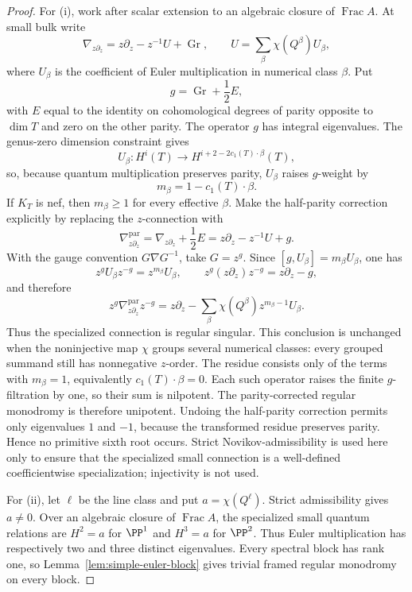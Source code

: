\begin{proof}
For (i), work after scalar extension to an algebraic closure of
\(\operatorname{Frac}A\).  At small bulk write
\[
 \nabla_{z\partial_z}=z\partial_z-z^{-1}U+\operatorname{Gr},
 \qquad
 U=\sum_{\beta}\chi(Q^\beta)U_\beta,
\]
where \(U_\beta\) is the coefficient of Euler multiplication in numerical
class \(\beta\).  Put
\[
 g=\operatorname{Gr}+\frac12E,
\]
with \(E\) equal to the identity on cohomological degrees of parity
opposite to \(\dim T\) and zero on the other parity.  The operator \(g\) has
integral eigenvalues.  The genus-zero dimension constraint gives
\[
 U_\beta:H^i(T)\longrightarrow
 H^{i+2-2c_1(T)\cdot\beta}(T),
\]
so, because quantum multiplication preserves parity, \(U_\beta\) raises
\(g\)-weight by
\[
 m_\beta=1-c_1(T)\cdot\beta.
\]
If \(K_T\) is nef, then \(m_\beta\ge1\) for every effective
\(\beta\).  Make the half-parity correction explicitly by replacing the
\(z\)-connection with
\[
 \nabla^{\mathrm{par}}_{z\partial_z}
 =\nabla_{z\partial_z}+\frac12E
 =z\partial_z-z^{-1}U+g.
\]
With the gauge convention \(G\nabla G^{-1}\), take \(G=z^g\).  Since
\([g,U_\beta]=m_\beta U_\beta\), one has
\[
 z^gU_\beta z^{-g}=z^{m_\beta}U_\beta,
 \qquad
 z^g(z\partial_z)z^{-g}=z\partial_z-g,
\]
and therefore
\[
 z^g\nabla^{\mathrm{par}}_{z\partial_z}z^{-g}
 =z\partial_z-
   \sum_\beta \chi(Q^\beta)z^{m_\beta-1}U_\beta.
\]
Thus the specialized connection is regular singular.  This conclusion is
unchanged when the noninjective map \(\chi\) groups several numerical
classes: every grouped summand still has nonnegative \(z\)-order.
The residue consists only of the terms with \(m_\beta=1\), equivalently
\(c_1(T)\cdot\beta=0\).  Each such operator raises the finite
\(g\)-filtration by one, so their sum is nilpotent.  The parity-corrected
regular monodromy is therefore unipotent.  Undoing the half-parity correction
permits only eigenvalues \(1\) and \(-1\), because the transformed residue
preserves parity.  Hence no primitive sixth root occurs.  Strict
Novikov-admissibility is used here only to ensure that the specialized small
connection is a well-defined coefficientwise specialization; injectivity is
not used.

For (ii), let \(\ell\) be the line class and put
\(a=\chi(Q^\ell)\).  Strict admissibility gives \(a\ne0\).  Over an
algebraic closure of \(\operatorname{Frac}A\), the specialized small
quantum relations are \(H^2=a\) for \(\PP^1\) and \(H^3=a\) for
\(\PP^2\).  Thus Euler multiplication has respectively two and three
distinct eigenvalues.
Every spectral block has rank one, so
Lemma~\ref{lem:simple-euler-block} gives trivial framed regular monodromy
on every block.


\end{proof}

